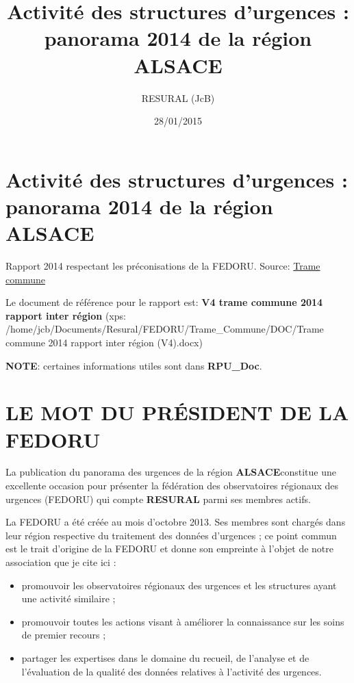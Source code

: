 \documentclass[]{article}
\title{Activité des structures d'urgences : panorama 2014 de la région ALSACE}
\author{RESURAL (JcB)}
\date{28/01/2015}
\begin{document}
\maketitle


{
\hypersetup{linkcolor=black}
\setcounter{tocdepth}{2}
\tableofcontents
}
\section{Activité des structures d'urgences : panorama 2014 de la région
ALSACE}\label{activite-des-structures-durgences-panorama-2014-de-la-region-alsace}

Rapport 2014 respectant les préconisations de la FEDORU. Source:
\href{https://docs.google.com/document/d/101LYVqVLeHZnrujfMm3aqBYfbOwx3CPEB3Y-Lbud2Ls/edit}{Trame
commune}

Le document de référence pour le rapport est: \textbf{V4 trame commune
2014 rapport inter région} (xps:
/home/jcb/Documents/Resural/FEDORU/Trame\_Commune/DOC/Trame commune 2014
rapport inter région (V4).docx)

\textbf{NOTE}: certaines informations utiles sont dans
\textbf{RPU\_Doc}.

\section{LE MOT DU PRÉSIDENT DE LA
FEDORU}\label{le-mot-du-president-de-la-fedoru}

La publication du panorama des urgences de la région
\textbf{ALSACE}constitue une excellente occasion pour présenter la
fédération des observatoires régionaux des urgences (FEDORU) qui compte
\textbf{RESURAL} parmi ses membres actifs.

La FEDORU a été créée au mois d'octobre 2013. Ses membres sont chargés
dans leur région respective du traitement des données d'urgences ; ce
point commun est le trait d'origine de la FEDORU et donne son empreinte
à l'objet de notre association que je cite ici :

\begin{itemize}
\itemsep1pt\parskip0pt
\item
  promouvoir les observatoires régionaux des urgences et les structures
  ayant une activité similaire ;
\item
  promouvoir toutes les actions visant à améliorer la connaissance sur
  les soins de premier recours ;
\item
  partager les expertises dans le domaine du recueil, de l'analyse et de
  l'évaluation de la qualité des données relatives à l'activité des
  urgences.
\end{itemize}
\end{document}
